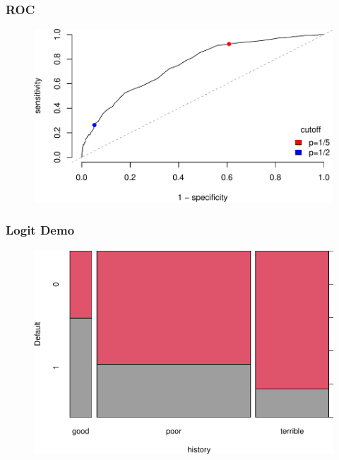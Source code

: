 \documentclass[
  shownotes,
  xcolor={svgnames},
  hyperref={colorlinks,citecolor=DarkBlue,linkcolor=DarkRed,urlcolor=DarkBlue}
  , aspectratio=169]{beamer}
\begin{document}
\begin{frame}[fragile]
\frametitle{ROC}


\begin{figure}[H] \centering
            \captionsetup{justification=centering}
              \includegraphics[scale=0.5]{figures/roc}                            
 \end{figure}


\end{frame}
\begin{frame}[fragile]
\frametitle{Logit Demo}


\begin{figure}[H] \centering
            \captionsetup{justification=centering}
              \includegraphics[scale=0.5]{figures/tiles} 
 \end{figure}

\end{frame}
\end{document}
